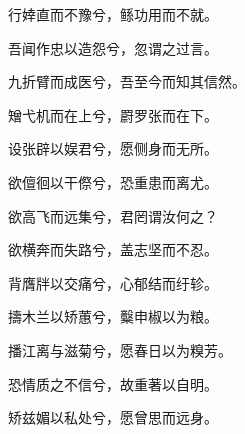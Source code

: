 \documentclass[12pt,a4paper]{ctexbook}
\begin{document}
行婞直而不豫兮，鲧功用而不就。\par
吾闻作忠以造怨兮，忽谓之过言。\par
九折臂而成医兮，吾至今而知其信然。\par
矰弋机而在上兮，罻罗张而在下。\par
设张辟以娱君兮，愿侧身而无所。\par
欲儃徊以干傺兮，恐重患而离尤。\par
欲高飞而远集兮，君罔谓汝何之？\par
欲横奔而失路兮，盖志坚而不忍。\par
背膺牉以交痛兮，心郁结而纡轸。\par
擣木兰以矫蕙兮，糳申椒以为粮。\par
播江离与滋菊兮，愿春日以为糗芳。\par
恐情质之不信兮，故重著以自明。\par
矫兹媚以私处兮，愿曾思而远身。\par
\end{document}
